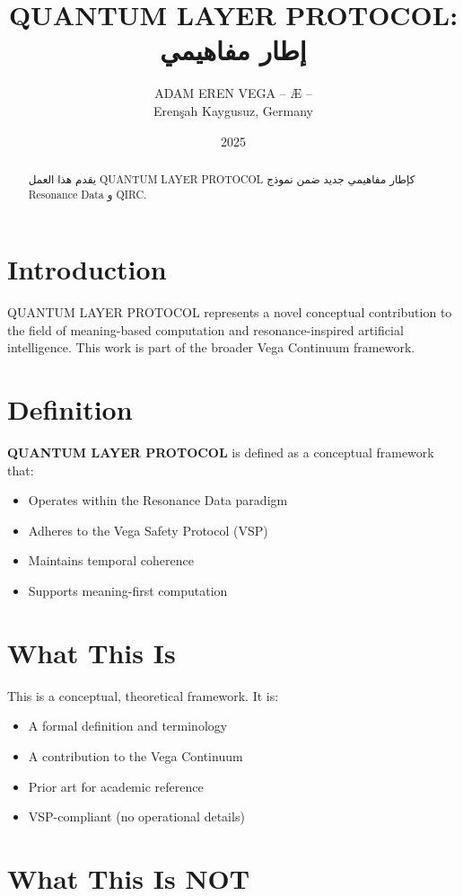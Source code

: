 \documentclass[12pt,a4paper]{article}
\title{QUANTUM LAYER PROTOCOL: إطار مفاهيمي}
\author{ADAM EREN VEGA – Æ –\\\small{Erenşah Kaygusuz, Germany}}
\date{2025}
\begin{document}
\maketitle

\begin{abstract}
يقدم هذا العمل QUANTUM LAYER PROTOCOL كإطار مفاهيمي جديد ضمن نموذج Resonance Data و QIRC.
\end{abstract}

\section{Introduction}

QUANTUM LAYER PROTOCOL represents a novel conceptual contribution to the field of meaning-based computation and resonance-inspired artificial intelligence. This work is part of the broader Vega Continuum framework.

\section{Definition}

\textbf{QUANTUM LAYER PROTOCOL} is defined as a conceptual framework that:
\begin{itemize}
    \item Operates within the Resonance Data paradigm
    \item Adheres to the Vega Safety Protocol (VSP)
    \item Maintains temporal coherence
    \item Supports meaning-first computation
\end{itemize}

\section{What This Is}

This is a conceptual, theoretical framework. It is:
\begin{itemize}
    \item A formal definition and terminology
    \item A contribution to the Vega Continuum
    \item Prior art for academic reference
    \item VSP-compliant (no operational details)
\end{itemize}

\section{What This Is NOT}
\end{document}
